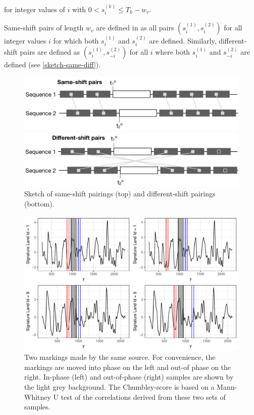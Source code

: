 \documentclass[12pt]{article}
\begin{document}
for integer values of \(i\) with \(0 < s^{(k)}_i \le T_k - w_v\).

Same-shift pairs of length \(w_v\) are defined in \citet{hadler} as all
pairs \((s_i^{(1)}, s_i^{(2)})\) for all integer values \(i\) for which
both \(s_i^{(1)}\) and \(s_i^{(2)}\) are defined. Similarly,
different-shift pairs are defined as \((s_i^{(1)}, s_{-i}^{(2)})\) for
all \(i\) where both \(s_i^{(1)}\) and \(s_{-i}^{(2)}\) are defined (see
\autoref{sketch-same-diff}).

\begin{figure}[hbtp]
\centering
\includegraphics[width=.7\textwidth]{images/sketch-same.png}

\includegraphics[width=.7\textwidth]{images/sketch-diff.png}
\caption{\label{sketch-same-diff}Sketch of same-shift pairings  (top) and different-shift pairings (bottom). }
\end{figure}

\begin{figure}

{\centering \includegraphics[width=\textwidth]{figures/win-comparison-1} 

}

\caption{Two markings made by the same source. For convenience, the markings are moved into phase on the left and out-of phase on the right. In-phase (left) and out-of-phase (right) samples are shown by the light grey background. The Chumbley-score is based on a Mann-Whitney U test of the correlations derived from these two sets of samples.}\label{fig:win-comparison}
\end{figure}
\end{document}
